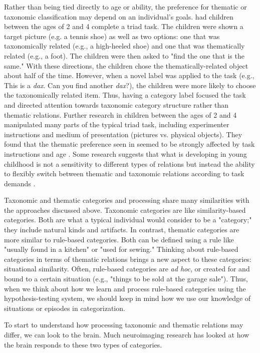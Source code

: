 \documentclass[../dissertation.tex]{subfiles}
\begin{document}
		Rather than being tied directly to age or ability, the preference for thematic or taxonomic classification may depend on an individual's goals. \citet{Markman1984} had children between the ages of 2 and 4 complete a triad task. The children were shown a target picture (e.g. a tennis shoe) as well as two options: one that was taxonomically related (e.g., a high-heeled shoe) and one that was thematically related (e.g., a foot). The children were then asked to "find the one that is the same." With these directions, the children chose the thematically-related object about half of the time. However, when a novel label was applied to the task (e.g., This is a \textit{dax}. Can you find another \textit{dax}?), the children were more likely to choose the taxonomically related item. Thus, having a category label focused the task and  directed attention towards taxonomic category structure rather than thematic relations. Further research in children between the ages of 2 and 4 manipulated many parts of the typical triad task, including experimenter instructions and medium of presentation (pictures vs. physical objects). They found that the thematic preference seen in \citet{Smiley1979} seemed to be strongly affected by task instructions and age \citep{Waxman1997}. Some research suggests that what is developing in young childhood is not a sensitivity to different types of relations but instead the ability to flexibly switch between thematic and taxonomic relations according to task demands \citep{Blaye2001}. \par
		Taxonomic and thematic categories and processing share many similarities with the approaches discussed above. Taxonomic categories are like similarity-based categories. Both are what a typical individual would consider to be a "category;" they include natural kinds and artifacts. In contrast, thematic categories are more similar to rule-based categories. Both can be defined using a rule like "usually found in a kitchen" or "used for sewing." Thinking about rule-based categories in terms of thematic relations brings a new aspect to these categories: situational similarity. Often, rule-based categories are \textit{ad hoc}, or created for and bound to a certain situation (e.g., "things to be sold at the garage sale"). Thus, when we think about how we learn and process rule-based categories using the hypothesis-testing system, we should keep in mind how we use our knowledge of situations or episodes in categorization. \par
		To start to understand how processing taxonomic and thematic relations may differ, we can look to the brain. Much neuroimaging research has looked at how the brain responds to these two types of categories. 
			
\end{document}
